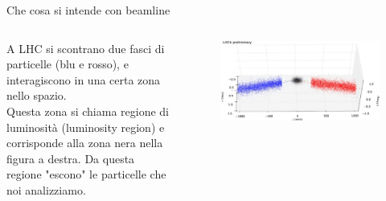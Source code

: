 \documentclass[
10pt,
aspectratio=169,
]{beamer}
\begin{document}
\begin{frame}{Che cosa si intende con beamline}
\begin{columns}
    A LHC si scontrano due fasci di particelle (blu e rosso), e interagiscono in una certa zona nello spazio.\\
    \vspace{0.5cm}
    Questa zona si chiama regione di luminosità (luminosity region) e corrisponde alla zona nera nella figura a destra. Da questa regione "escono" le particelle che noi analizziamo.\\

\begin{figure}
    \centering
    \includegraphics[width=\textwidth]{figures/bgi-transformed.jpeg}
\end{figure}
    \end{columns}

\end{frame}
\end{document}
